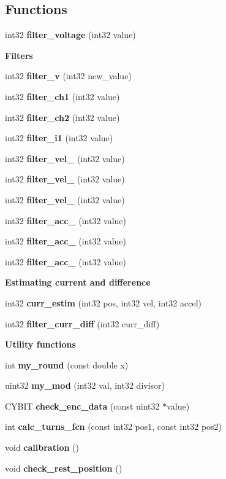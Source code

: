\subsection*{Functions}
\begin{DoxyCompactItemize}
\item 
int32 \textbf{ filter\+\_\+voltage} (int32 value)
\end{DoxyCompactItemize}
\begin{Indent}\textbf{ Filters}\par
\begin{DoxyCompactItemize}
\item 
int32 \textbf{ filter\+\_\+v} (int32 new\+\_\+value)
\item 
int32 \textbf{ filter\+\_\+ch1} (int32 value)
\item 
int32 \textbf{ filter\+\_\+ch2} (int32 value)
\item 
int32 \textbf{ filter\+\_\+i1} (int32 value)
\item 
int32 \textbf{ filter\+\_\+vel\+\_} (int32 value)
\item 
int32 \textbf{ filter\+\_\+vel\+\_} (int32 value)
\item 
int32 \textbf{ filter\+\_\+vel\+\_} (int32 value)
\item 
int32 \textbf{ filter\+\_\+acc\+\_} (int32 value)
\item 
int32 \textbf{ filter\+\_\+acc\+\_} (int32 value)
\item 
int32 \textbf{ filter\+\_\+acc\+\_} (int32 value)
\end{DoxyCompactItemize}
\end{Indent}
\begin{Indent}\textbf{ Estimating current and difference}\par
\begin{DoxyCompactItemize}
\item 
int32 \textbf{ curr\+\_\+estim} (int32 pos, int32 vel, int32 accel)
\item 
int32 \textbf{ filter\+\_\+curr\+\_\+diff} (int32 curr\+\_\+diff)
\end{DoxyCompactItemize}
\end{Indent}
\begin{Indent}\textbf{ Utility functions}\par
\begin{DoxyCompactItemize}
\item 
int \textbf{ my\+\_\+round} (const double x)
\item 
uint32 \textbf{ my\+\_\+mod} (int32 val, int32 divisor)
\item 
C\+Y\+B\+IT \textbf{ check\+\_\+enc\+\_\+data} (const uint32 $\ast$value)
\item 
int \textbf{ calc\+\_\+turns\+\_\+fcn} (const int32 pos1, const int32 pos2)
\item 
void \textbf{ calibration} ()
\item 
void \textbf{ check\+\_\+rest\+\_\+position} ()
\end{DoxyCompactItemize}
\end{Indent}


